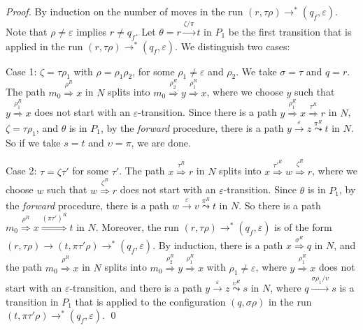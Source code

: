 \documentclass{llncs}
\newcommand{\eps}{\ensuremath{\varepsilon}}
\begin{document}
\begin{proof}
By induction on the number of moves in the run $(r,\tau\rho)\rightarrow^*(q_f,\eps)$.
Note that $\rho\neq\eps$ implies $r\neq q_f$. Let $\theta=r\stackrel{\zeta/\pi}{\rightarrow}t$ in $P_1$
be the first transition that is applied in the run $(r,\tau\rho)\rightarrow^*(q_f,\eps)$. We distinguish two cases:

\vspace{1mm}

\noindent
{\sc Case 1}: $\zeta=\tau\rho_1$ with $\rho=\rho_1\rho_2$, for some $\rho_1\neq\eps$ and $\rho_2$.
We take $\sigma=\tau$ and $q=r$. The path $m_0\stackrel{\rho^R}{\Rightarrow}x$ in $N$ splits into
$m_0\stackrel{\rho_2^R}{\Rightarrow}y\stackrel{\rho_1^R}{\Rightarrow}x$, where we choose $y$ such that
$y\stackrel{\rho_1^R}{\Rightarrow}x$ does not start with an $\eps$-transition.
Since there is a path $y\stackrel{\rho_1^R}{\Rightarrow}x\stackrel{\tau^R}{\Rightarrow}r$ in $N$, $\zeta=\tau\rho_1$,
and $\theta$ is in $P_1$, by the {\em forward} procedure, there is a path $y\stackrel{\eps}{\rightarrow}z\stackrel{\pi^R}{\leadsto}t$ in $N$.
So if we take $s=t$ and $\upsilon=\pi$, we are done.

\vspace{1mm}

\noindent
{\sc Case 2}: $\tau=\zeta\tau'$ for some $\tau'$. The path $x\stackrel{\tau^R}{\Rightarrow}r$ in $N$
splits into $x\stackrel{\tau'^R}{\Rightarrow}w\stackrel{\zeta^R}{\Rightarrow}r$, where we choose $w$ such that
$w\stackrel{\zeta^R}{\Rightarrow}r$ does not start with an $\eps$-transition.
Since $\theta$ is in $P_1$, by the {\em forward} procedure, there is a path $w\stackrel{\eps}{\rightarrow}v\stackrel{\pi^R}{\leadsto}t$ in $N$.
So there is a path $m_0\stackrel{\rho^R}{\Rightarrow}x\stackrel{(\pi\tau')^R}{\Rightarrow}t$ in $N$.
Moreover, the run $(r,\tau\rho)\rightarrow^*(q_f,\eps)$ is of the form
$(r,\tau\rho)\rightarrow(t,\pi\tau'\rho)\rightarrow^*(q_f,\eps)$.
By induction, there is a path $x\stackrel{\sigma^R}{\Rightarrow}q$ in $N$,
and the path $m_0\stackrel{\rho^R}{\Rightarrow}x$ in $N$ splits into $m_0\stackrel{\rho_2^R}{\Rightarrow}y\stackrel{\rho_1^R}{\Rightarrow}x$
with $\rho_1\neq\eps$,
where $y\stackrel{\rho_1^R}{\Rightarrow}x$ does not start with an $\eps$-transition, and
there is a path $y\stackrel{\eps}{\rightarrow}z\stackrel{\upsilon^R}{\leadsto}s$ in $N$,
where $q\stackrel{\sigma\rho_1/\upsilon}{\rightarrow}s$ is a transition in $P_1$ that is applied to the configuration $(q,\sigma\rho)$
in the run $(t,\pi\tau'\rho)\rightarrow^*(q_f,\eps)$.
\qed
\end{proof}
\end{document}
